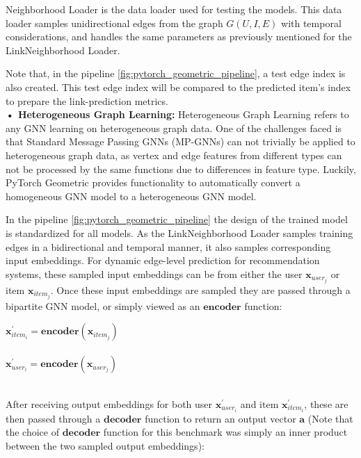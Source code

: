 \documentclass{scrartcl}
\begin{document}
Neighborhood Loader\cite{sageconv} is the data loader used for testing the models. This data loader samples unidirectional edges from the graph $G(U,I,E)$ with temporal considerations, and handles the same parameters as previously mentioned for the LinkNeighborhood Loader.

Note that, in the pipeline \ref{fig:pytorch_geometric_pipeline}, a test edge index is also created. This test edge index will be compared to the predicted item’s index to prepare the link-prediction metrics. \\ 

\textbf{• Heterogeneous Graph Learning:} Heterogeneous Graph Learning refers to any GNN learning on heterogeneous graph data. One of the challenges faced is that Standard Message Passing GNNs (MP-GNNs) can not trivially be applied to heterogeneous graph data, as vertex and edge features from different types can not be processed by the same functions due to differences in feature type. Luckily, PyTorch Geometric provides functionality to automatically convert a homogeneous GNN model to a heterogeneous GNN model. 

In the pipeline \ref{fig:pytorch_geometric_pipeline} the design of the trained model is standardized for all models. As the LinkNeighborhood Loader samples training edges in a bidirectional and temporal manner, it also samples corresponding input embeddings. For dynamic edge-level prediction for recommendation systems, these sampled input embeddings can be from either the user $\mathbf{x}_{user_{j}}$ or item $\mathbf{x}_{item_{j}}$. Once these input embeddings are sampled they are passed through a bipartite GNN model, or simply viewed as an $\textbf{encoder}$ function: \\ 

\begin{center}
    $\mathbf{x}^{\prime}_{item_{i}} = \textbf{encoder}(\mathbf{x}_{item_{j}})$ \\~\\ 
    $\mathbf{x}^{\prime}_{user_{i}} = \textbf{encoder}(\mathbf{x}_{user_{j}})$ \\~\\
\end{center} 

After receiving output embeddings for both user $\mathbf{x}^{\prime}_{user_{i}}$ and item $\mathbf{x}^{\prime}_{item_{i}}$, these are then passed through a $\textbf{decoder}$ function to return an output vector $\mathbf{a}$  (Note that the choice of $\textbf{decoder}$ function for this benchmark was simply an inner product between the two sampled output embeddings): \\ 
\end{document}

